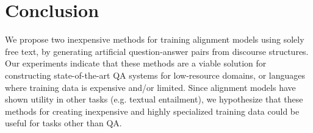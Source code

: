 







\section{Conclusion}
\label{sec-naacl2015:conclusion}

We propose two inexpensive methods for training alignment models using solely free text, by generating artificial question-answer pairs from discourse structures. 
Our experiments indicate that these methods are a viable solution for constructing state-of-the-art QA systems for low-resource domains, or languages where training data is expensive and/or limited.  Since alignment models have shown utility in other tasks (e.g. textual entailment), we hypothesize that these methods for creating inexpensive and highly specialized training data could be useful for tasks other than QA.  


